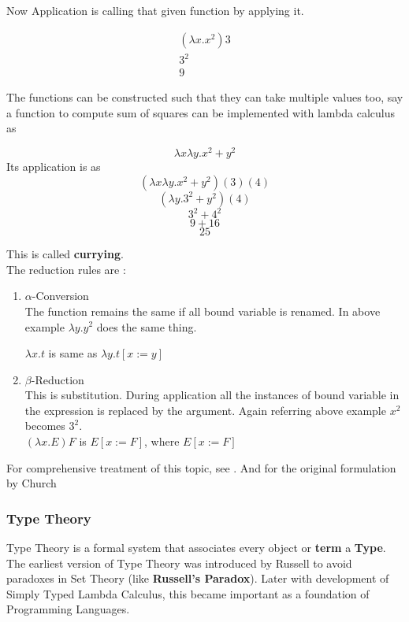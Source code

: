 \documentclass[12pt]{article}
\begin{document}
Now Application is calling that given function by applying it.

\begin{example}
\begin{align*}
 (\lambda x.x^2) 3\\
 3^2 \\
 9
\end{align*}
\end{example}
The functions can be constructed such that they can take multiple values too, say a function to compute sum of squares can be implemented with lambda calculus as

\begin{example}
    $$\lambda x \lambda y. x^2 +y^2$$
Its application is as 
$$(\lambda x \lambda y. x^2 +y^2) (3) (4)$$
$$(\lambda y. 3^2 + y^2)(4)$$
$$3^2+4^2$$
$$9+16$$
$$25$$
\end{example}

This is called \textbf{currying}.\\
The reduction rules are :

\begin{enumerate}
    \item $\alpha$-Conversion \\
    \indent The function remains the same if all bound variable is renamed.
    In above example $\lambda y. y^2$ does the same thing.

$\lambda x.t$ is same as $ \lambda y.t[x:=y]$
    \item $\beta$-Reduction\\
     This is substitution. During application all the instances of bound variable in the expression is replaced by the argument. Again referring above example $x^2$ becomes $3^2$.\\
     $(\lambda x.E) F$ is $E[x := F]$, where $E[x := F]$
\end{enumerate}
For comprehensive treatment of this topic, see \cite{Rojas2015}. And for the original formulation by Church \cite{}





\subsubsection{Type Theory}
Type Theory is a formal system that associates every object or \textbf{term} a \textbf{Type}. The earliest version of Type Theory was introduced by Russell to avoid paradoxes in Set Theory (like \textbf{Russell's Paradox}). Later with development of Simply Typed Lambda Calculus, this became important as a foundation of Programming Languages.\\
\end{document}
